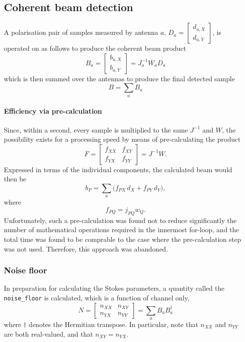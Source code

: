 \documentclass{article}
\begin{document}
\subsection{Coherent beam detection}
A polarisation pair of samples measured by antenna $a$, $D_a = \begin{bmatrix} d_{a,X} \\ d_{a,Y} \end{bmatrix}$, is operated on as follows to produce the coherent beam product
\begin{equation}
    B_a = \begin{bmatrix} b_{a,X} \\ b_{a,Y} \end{bmatrix} = J_a^{-1} W_a D_a
\end{equation}
which is then summed over the antennas to produce the final detected sample
\begin{equation}
    B = \sum_a B_a
\end{equation}

\paragraph{Efficiency via pre-calculation}
\label{sec:precalc1}
Since, within a second, every sample is multiplied to the same $J^{-1}$ and $W$, the possibility exists for a processing speed by means of pre-calculating the product
\begin{equation}
    F = \begin{bmatrix} f_{XX} & f_{XY} \\ f_{YX} & f_{YY} \end{bmatrix} = J^{-1} W.
\end{equation}
Expressed in terms of the individual components, the calculated beam would then be
\begin{equation}
    b_P = \sum_a \bigg(f_{PX} \, d_X + f_{PY} \, d_Y\bigg),
\end{equation}
where
\begin{equation}
    f_{PQ} = j_{PQ} w_Q.
\end{equation}
Unfortunately, such a pre-calculation was found not to reduce significantly the number of mathematical operations required in the innermost for-loop, and the total time was found to be comprable to the case where the pre-calculation step was not used.
Therefore, this approach was abandoned.

\subsubsection{Noise floor}
In preparation for calculating the Stokes parameters, a quantity called the \texttt{noise\_floor} is calculated, which is a function of channel only,
\begin{equation}
    N = \begin{bmatrix} n_{XX} & n_{XY} \\ n_{YX} & n_{YY} \end{bmatrix}
      = \sum_a B_a B_a^\dagger
\end{equation}
where $\dagger$ denotes the Hermitian transpose.
In particular, note that $n_{XX}$ and $n_{YY}$ are both real-valued, and that $n_{XY} = n_{YX}$.
\end{document}
